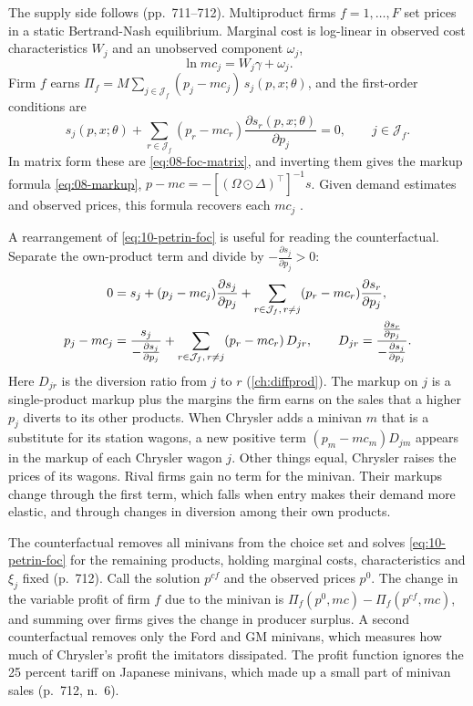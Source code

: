 The supply side follows \citet{BerryLevinsohnPakes1995} (pp.~711--712). Multiproduct firms $f = 1, \dots, F$ set prices
in a static Bertrand-Nash equilibrium. Marginal cost is log-linear in observed cost characteristics $W_j$ and an
unobserved component $\omega_j$,
\begin{equation}\label{eq:10-petrin-mc}
  \ln mc_j = W_j\gamma + \omega_j .
\end{equation}
Firm $f$ earns $\Pi_f = M\sum_{j\in\mathcal{J}_f}(p_j - mc_j)\,s_j(p, x; \theta)$, and the first-order conditions are
\begin{equation}\label{eq:10-petrin-foc}
  s_j(p, x; \theta) + \sum_{r \in \mathcal{J}_f}(p_r - mc_r)\frac{\partial s_r(p, x; \theta)}{\partial p_j} = 0,
  \qquad j \in \mathcal{J}_f .
\end{equation}
In matrix form these are \eqref{eq:08-foc-matrix}, and inverting them gives the markup formula \eqref{eq:08-markup},
$p - mc = -[(\Omega\odot\Delta)^\top]^{-1}s$. Given demand estimates and observed prices, this formula recovers each
$mc_j$ \citep[eq.~3]{Petrin2002}.

A rearrangement of \eqref{eq:10-petrin-foc} is useful for reading the counterfactual. Separate the own-product term
and divide by $-\frac{\partial s_j}{\partial p_j} > 0$:
\begin{align}
  0 &= s_j + (p_j - mc_j)\frac{\partial s_j}{\partial p_j}
       + \sum_{r\in\mathcal{J}_f,\, r\ne j}(p_r - mc_r)\frac{\partial s_r}{\partial p_j}, \notag\\
  p_j - mc_j &= \frac{s_j}{-\frac{\partial s_j}{\partial p_j}}
       + \sum_{r\in\mathcal{J}_f,\, r\ne j}(p_r - mc_r)\,D_{jr},
  \qquad D_{jr} = \frac{\frac{\partial s_r}{\partial p_j}}{-\frac{\partial s_j}{\partial p_j}} . \label{eq:10-petrin-diversion}
\end{align}
Here $D_{jr}$ is the diversion ratio from $j$ to $r$ (\cref{ch:diffprod}). The markup on $j$ is a single-product
markup plus the margins the firm earns on the sales that a higher $p_j$ diverts to its other products. When Chrysler
adds a minivan $m$ that is a substitute for its station wagons, a new positive term $(p_m - mc_m)D_{jm}$ appears in the
markup of each Chrysler wagon $j$. Other things equal, Chrysler raises the prices of its wagons. Rival firms gain no
term for the minivan. Their markups change through the first term, which falls when entry makes their demand more
elastic, and through changes in diversion among their own products.

The counterfactual removes all minivans from the choice set and solves \eqref{eq:10-petrin-foc} for the remaining
products, holding marginal costs, characteristics and $\xi_j$ fixed (p.~712). Call the solution $p^{cf}$ and the
observed prices $p^0$. The change in the variable profit of firm $f$ due to the minivan is $\Pi_f(p^0, mc) -
\Pi_f(p^{cf}, mc)$, and summing over firms gives the change in producer surplus. A second counterfactual removes only
the Ford and GM minivans, which measures how much of Chrysler's profit the imitators dissipated. The profit function
ignores the 25 percent tariff on Japanese minivans, which made up a small part of minivan sales (p.~712, n.~6).

